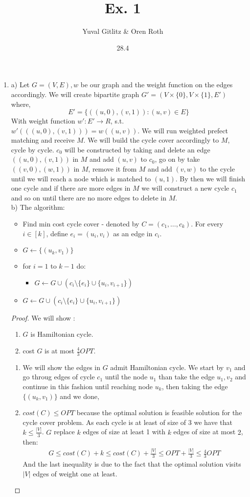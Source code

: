 \documentclass{article}
\title{Ex. 1}
\author{Yuval Gitlitz \& Oren Roth}
\date{28.4}
\begin{document}
\maketitle

\begin{enumerate}
	\item
a) Let $G=(V,E),w$ be our graph and the weight function on the edges accordingly. We will create bipartite graph $G'=(V\times \{0\},V\times \{1\},E')$ where,
$$E' = \{((u,0),(v,1)): (u,v)\in E \}$$
With weight function $w':E'\rightarrow R$, s.t. $w'(((u,0),(v,1))) = w((u,v))$. We will run weighted prefect matching and receive $M$. We will build the cycle cover accordingly to $M$, cycle by cycle. $c_0$ will be constructed by taking and delete an edge $((u,0),(v,1))$ in $M$ and add $(u,v)$ to $c_0$, go on by take $((v,0),(w,1))$ in $M$, remove it from $M$ and add $(v,w)$ to the cycle until we will reach a node which is matched to $(u,1)$. By then we will finish one cycle and if there are more edges in $M$ we will construct a new cycle $c_1$ and so on until there are no more edges to delete in $M$.
\\ 
b) The algorithm:
\begin{itemize}
	\item Find min cost cycle cover - denoted by $C = (c_1,\ldots,c_k)$. For every $i \in [k]$, define $e_i = (u_i,v_i)$ as an edge in $c_i$.
	\item $G\leftarrow \{(u_k,v_1)\}$
	\item for $i=1$ to $k-1$ do:
	\begin{itemize}
		\item $G \leftarrow G \cup (c_i \setminus \{e_i\} \cup \{u_i,v_{i+1}\})$
	\end{itemize}
	\item $G \leftarrow G \cup (c_i \setminus \{e_i\} \cup \{u_i,v_{i+1}\})$
\end{itemize}
\begin{proof}
We will show :
\begin{enumerate}[I]
	\item $G$ is Hamiltonian cycle. 
	\item cost $G$ is at most $\frac{4}{3}OPT$. 
\end{enumerate}
\begin{enumerate}[I]
	\item We will show the edges in $G$ admit Hamiltonian cycle. We start by $v_1$ and go throug edges of cycle $c_1$ until the node $u_1$ than take the edge $u_1,v_2$ and continue in this fashion until reaching node $u_k$, then taking the edge $\{(u_k,v_1)\}$ and we done,
	\item $cost(C) \le OPT$ because the optimal solution is feasible solution for the cycle cover problem. 
	As each cycle is at least of size of 3 we have that $k\le \frac{|V|}{3}$. $G$ replace $k$ edges of size at least 1 with $k$ edges of size at most $2$, then:
	\begin{align*}
	G \le cost(C) + k \le cost(C) + \frac{|V|}{3} \le OPT +\frac{|V|}{3} \le \frac{4}{3}OPT
	\end{align*}
	And the last inequality is due to the fact that the optimal solution visits $|V|$ edges of weight one at least. 
	

\end{enumerate}
\end{proof}
\end{enumerate}
\end{document}

